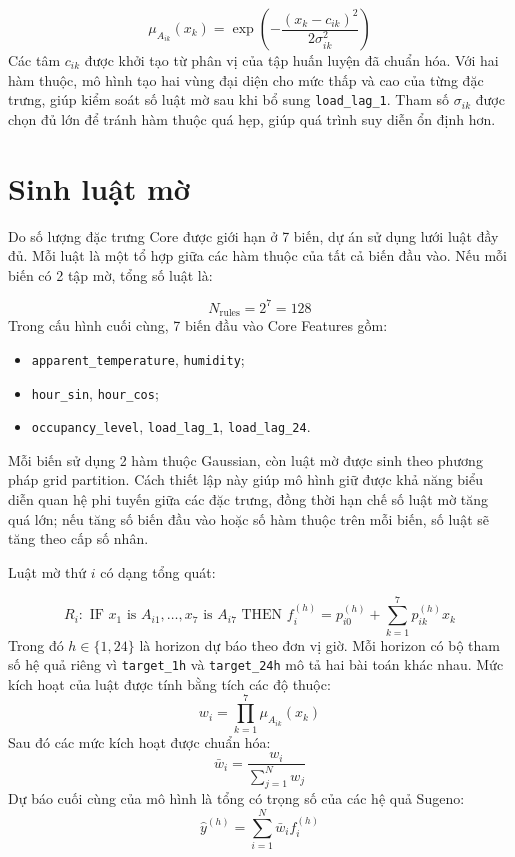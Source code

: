 \begin{equation}
  \mu_{A_{ik}}(x_k) =
  \exp\left(-\frac{(x_k-c_{ik})^2}{2\sigma_{ik}^2}\right)
\end{equation}
Các tâm $c_{ik}$ được khởi tạo từ phân vị của tập huấn luyện đã chuẩn hóa. Với hai hàm thuộc, mô hình tạo hai vùng đại diện cho mức thấp và cao của từng đặc trưng, giúp kiểm soát số luật mờ sau khi bổ sung \texttt{load\_lag\_1}. Tham số $\sigma_{ik}$ được chọn đủ lớn để tránh hàm thuộc quá hẹp, giúp quá trình suy diễn ổn định hơn.

\section{Sinh luật mờ}

Do số lượng đặc trưng Core được giới hạn ở 7 biến, dự án sử dụng lưới luật đầy đủ. Mỗi luật là một tổ hợp giữa các hàm thuộc của tất cả biến đầu vào. Nếu mỗi biến có 2 tập mờ, tổng số luật là:

\begin{equation}
  N_{\text{rules}} = 2^7 = 128
\end{equation}
Trong cấu hình cuối cùng, 7 biến đầu vào Core Features gồm:
\begin{itemize}[leftmargin=1.2cm, itemsep=0pt]
  \item \texttt{apparent\_temperature}, \texttt{humidity};
  \item \texttt{hour\_sin}, \texttt{hour\_cos};
  \item \texttt{occupancy\_level}, \texttt{load\_lag\_1}, \texttt{load\_lag\_24}.
\end{itemize}
Mỗi biến sử dụng 2 hàm thuộc Gaussian, còn luật mờ được sinh theo phương pháp grid partition. Cách thiết lập này giúp mô hình giữ được khả năng biểu diễn quan hệ phi tuyến giữa các đặc trưng, đồng thời hạn chế số luật mờ tăng quá lớn; nếu tăng số biến đầu vào hoặc số hàm thuộc trên mỗi biến, số luật sẽ tăng theo cấp số nhân.

Luật mờ thứ $i$ có dạng tổng quát:

\begin{equation}
  R_i: \text{ IF } x_1 \text{ is } A_{i1}, \ldots, x_7 \text{ is } A_{i7}
  \text{ THEN } f_i^{(h)} = p_{i0}^{(h)} + \sum_{k=1}^{7}p_{ik}^{(h)}x_k
\end{equation}
Trong đó $h \in \{1, 24\}$ là horizon dự báo theo đơn vị giờ. Mỗi horizon có bộ tham số hệ quả riêng vì \texttt{target\_1h} và \texttt{target\_24h} mô tả hai bài toán khác nhau.
Mức kích hoạt của luật được tính bằng tích các độ thuộc:
\begin{equation}
  w_i = \prod_{k=1}^{7}\mu_{A_{ik}}(x_k)
\end{equation}
Sau đó các mức kích hoạt được chuẩn hóa:
\begin{equation}
  \bar{w}_i = \frac{w_i}{\sum_{j=1}^{N}w_j}
\end{equation}
Dự báo cuối cùng của mô hình là tổng có trọng số của các hệ quả Sugeno:
\begin{equation}
  \hat{y}^{(h)} = \sum_{i=1}^{N}\bar{w}_i f_i^{(h)}
\end{equation}

